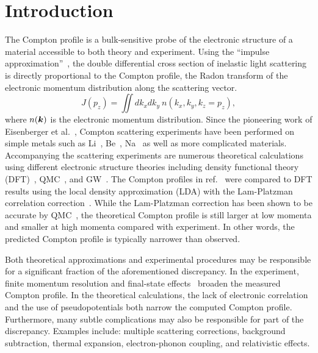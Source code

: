 \section{Introduction} \label{sec:intro}

The Compton profile is a bulk-sensitive probe of the electronic structure of a material accessible to both theory and experiment. Using the ``impulse approximation''~\cite{Eisenberger1970}, the double differential cross section of inelastic light scattering is directly proportional to the Compton profile, the Radon transform of the electronic momentum distribution along the scattering vector. \begin{equation}
J(p_z) = \iint dk_x dk_y ~ n(k_x, k_y, k_z=p_z),
\end{equation}
where $n(\boldsymbol{k})$ is the electronic momentum distribution.
Since the pioneering work of Eisenberger et al.~\cite{Eisenberger1970,Eisenberger1972}, Compton scattering experiments have been performed on simple metals such as Li~\cite{Sakurai1995, Schulke1996,Chen1999,Sternemann2001,Tanaka2001}, Be~\cite{Hamalainen1996,Huotari2000}, Na~\cite{Huotari2010} as well as more complicated materials. Accompanying the scattering experiments are numerous theoretical calculations using different electronic structure theories including density functional theory (DFT)~\cite{Sakurai1995,Schulke1996,Tanaka2001,Jarlborg1998,Baruah1999,Bross2005,Makkonen2005,Klevak2016,Sekania2018}, QMC~\cite{Filippi1999,Huotari2010}, and GW~\cite{Yasunori1997,Schulke1999,Eguiluz2000,Olevano2012}.
The Compton profiles in ref.~\cite{Sakurai1995,Schulke1996} were compared to DFT results using the local density approximation (LDA) with the Lam-Platzman correlation correction~\cite{Lam1974}.
While the Lam-Platzman correction has been shown to be accurate by QMC~\cite{Filippi1999,Schulke2001,Bross2005}, the theoretical Compton profile is still larger at low momenta and smaller at high momenta compared with experiment. In other words, the predicted Compton profile is typically narrower than observed.

Both theoretical approximations and experimental procedures may be responsible for a significant fraction of the aforementioned discrepancy. In the experiment, finite momentum resolution and final-state effects~\cite{Sternemann2000,Soininen2001} broaden the measured Compton profile. In the theoretical calculations, the lack of electronic correlation and the use of pseudopotentials both narrow the computed Compton profile. Furthermore, many subtle complications may also be responsible for part of the discrepancy. Examples include: multiple scattering corrections, background subtraction, thermal expansion, electron-phonon coupling, and relativistic effects.


